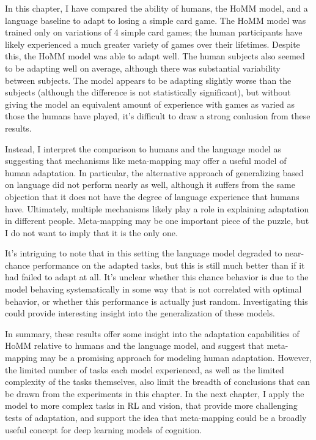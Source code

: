 In this chapter, I have compared the ability of humans, the HoMM model, and a language baseline to adapt to losing a simple card game. The HoMM model was trained only on variations of 4 simple card games; the human participants have likely experienced a much greater variety of games over their lifetimes. Despite this, the HoMM model was able to adapt well. The human subjects also seemed to be adapting well on average, although there was substantial variability between subjects. The model appears to be adapting slightly worse than the subjects (although the difference is not statistically significant), but without giving the model an equivalent amount of experience with games as varied as those the humans have played, it's difficult to draw a strong conlusion from these results. \par
Instead, I interpret the comparison to humans and the language model as suggesting that mechanisms like meta-mapping may offer a useful model of human adaptation. In particular, the alternative approach of generalizing based on language did not perform nearly as well, although it suffers from the same objection that it does not have the degree of language experience that humans have. Ultimately, multiple mechanisms likely play a role in explaining adaptation in different people. Meta-mapping may be one important piece of the puzzle, but I do not want to imply that it is the only one. \par 
It's intriguing to note that in this setting the language model degraded to near-chance performance on the adapted tasks, but this is still much better than if it had failed to adapt at all. It's unclear whether this chance behavior is due to the model behaving systematically in some way that is not correlated with optimal behavior, or whether this performance is actually just random. Investigating this could provide interesting insight into the generalization of these models. \par
In summary, these results offer some insight into the adaptation capabilities of HoMM relative to humans and the language model, and suggest that meta-mapping may be a promising approach for modeling human adaptation. However, the limited number of tasks each model experienced, as well as the limited complexity of the tasks themselves, also limit the breadth of conclusions that can be drawn from the experiments in this chapter. In the next chapter, I apply the model to more complex tasks in RL and vision, that provide more challenging tests of adaptation, and support the idea that meta-mapping could be a broadly useful concept for deep learning models of cognition. \par  

